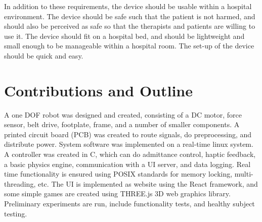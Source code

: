 \documentclass[12pt]{report}
\begin{document}
In addition to these requirements, the device should be usable within a hospital environment. The device should be safe such that the patient is not harmed, and should also be perceived as safe so that the therapists and patients are willing to use it. The device should fit on a hospital bed, and should be lightweight and small enough to be manageable within a hospital room. The set-up of the device should be quick and easy.








\section{Contributions and Outline}

A one DOF robot was designed and created, consisting of a DC motor, force sensor, belt drive, footplate, frame, and a number of smaller components. A printed circuit board (PCB) was created to route signals, do preprocessing, and distribute power. System software was implemented on a real-time linux system. A controller was created in C, which can do admittance control, haptic feedback, a basic physics engine, communication with a UI server, and data logging. Real time functionality is ensured using POSIX standards for memory locking, multi-threading, etc. The UI is implemented as website using the React framework, and some simple games are created using THREE.js 3D web graphics library. Preliminary experiments are run, include functionality tests, and healthy subject testing. 
\end{document}
